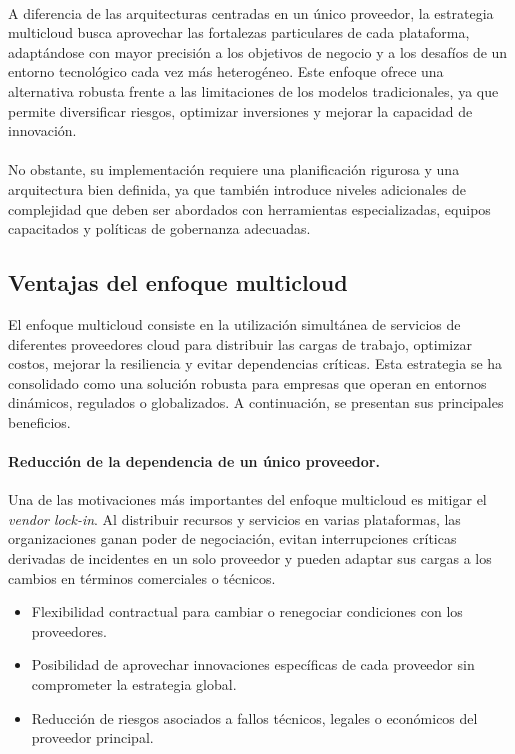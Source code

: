 {        \paragraph{}A diferencia de las arquitecturas centradas en un único proveedor, la estrategia multicloud busca aprovechar las fortalezas particulares de cada plataforma, adaptándose con mayor precisión a los objetivos de negocio y a los desafíos de un entorno tecnológico cada vez más heterogéneo. Este enfoque ofrece una alternativa robusta frente a las limitaciones de los modelos tradicionales, ya que permite diversificar riesgos, optimizar inversiones y mejorar la capacidad de innovación.
        
        \paragraph{}No obstante, su implementación requiere una planificación rigurosa y una arquitectura bien definida, ya que también introduce niveles adicionales de complejidad que deben ser abordados con herramientas especializadas, equipos capacitados y políticas de gobernanza adecuadas.

        \subsection{Ventajas del enfoque multicloud}
            El enfoque multicloud consiste en la utilización simultánea de servicios de diferentes proveedores cloud para distribuir las cargas de trabajo, optimizar costos, mejorar la resiliencia y evitar dependencias críticas. Esta estrategia se ha consolidado como una solución robusta para empresas que operan en entornos dinámicos, regulados o globalizados. A continuación, se presentan sus principales beneficios.
            
            \paragraph{Reducción de la dependencia de un único proveedor.} 
            Una de las motivaciones más importantes del enfoque multicloud es mitigar el \textit{vendor lock-in}. Al distribuir recursos y servicios en varias plataformas, las organizaciones ganan poder de negociación, evitan interrupciones críticas derivadas de incidentes en un solo proveedor y pueden adaptar sus cargas a los cambios en términos comerciales o técnicos.
            
            \begin{itemize}
                \item Flexibilidad contractual para cambiar o renegociar condiciones con los proveedores.
                \item Posibilidad de aprovechar innovaciones específicas de cada proveedor sin comprometer la estrategia global.
                \item Reducción de riesgos asociados a fallos técnicos, legales o económicos del proveedor principal.
            \end{itemize}
            
}
